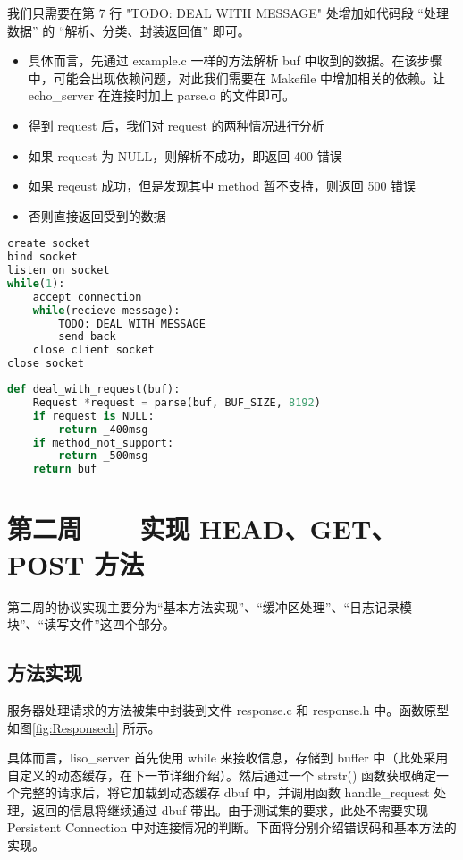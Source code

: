 我们只需要在第 7 行 "TODO: DEAL WITH MESSAGE" 处增加如代码段 “处理数据” 的 “解析、分类、封装返回值” 即可。

\begin{itemize}
    \item 具体而言，先通过 example.c 一样的方法解析 buf 中收到的数据。在该步骤中，可能会出现依赖问题，对此我们需要在 Makefile 中增加相关的依赖。让 echo\_server 在连接时加上 parse.o 的文件即可。
    \item 得到 request 后，我们对 request 的两种情况进行分析
    \item 如果 request 为 NULL，则解析不成功，即返回 400 错误
    \item 如果 reqeust 成功，但是发现其中 method 暂不支持，则返回 500 错误
    \item 否则直接返回受到的数据
\end{itemize}

\begin{lstlisting}[language=python, name={echo_server}]
create socket
bind socket
listen on socket
while(1):
    accept connection
    while(recieve message):
        TODO: DEAL WITH MESSAGE
        send back
    close client socket
close socket
\end{lstlisting}
    
\begin{lstlisting}[language=python, name={dealing with Data}]
def deal_with_request(buf):
    Request *request = parse(buf, BUF_SIZE, 8192)
    if request is NULL:
        return _400msg
    if method_not_support:
        return _500msg
    return buf
\end{lstlisting}

\section{第二周——实现 HEAD、GET、POST 方法}
第二周的协议实现主要分为“基本方法实现”、“缓冲区处理”、“日志记录模块”、“读写文件”这四个部分。

\subsection{方法实现}

服务器处理请求的方法被集中封装到文件 response.c 和 response.h 中。函数原型如图\ref{fig:Responsech} 所示。

具体而言，liso\_server 首先使用 while 来接收信息，存储到 buffer 中（此处采用自定义的动态缓存，在下一节详细介绍）。然后通过一个 strstr() 函数获取确定一个完整的请求后，将它加载到动态缓存 dbuf 中，并调用函数 handle\_request 处理，返回的信息将继续通过 dbuf 带出。由于测试集的要求，此处不需要实现 Persistent Connection 中对连接情况的判断。下面将分别介绍错误码和基本方法的实现。

